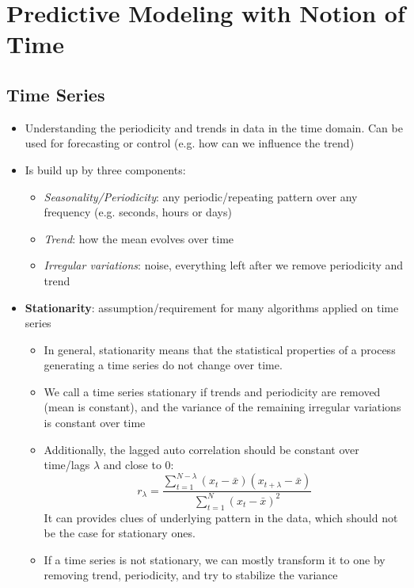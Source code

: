 \section{Predictive Modeling with Notion of Time}
\subsection{Time Series}
\begin{itemize}
	\item Understanding the periodicity and trends in data in the time domain. Can be used for forecasting or control (e.g. how can we influence the trend)
	\item Is build up by three components:
	\begin{itemize}
		\item \textit{Seasonality/Periodicity}: any periodic/repeating pattern over any frequency (e.g. seconds, hours or days)
		\item \textit{Trend}: how the mean evolves over time
		\item \textit{Irregular variations}: noise, everything left after we remove periodicity and trend
	\end{itemize}
	\item \textbf{Stationarity}: assumption/requirement for many algorithms applied on time series
	\begin{itemize}
		\item In general, stationarity means that the statistical properties of a process generating a time series do not change over time.
		\item We call a time series stationary if trends and periodicity are removed (mean is constant), and the variance of the remaining irregular variations is constant over time
		\item Additionally, the lagged auto correlation should be constant over time/lags $\lambda$ and close to $0$:
		$$r_{\lambda} = \frac{\sum\limits_{t=1}^{N-\lambda} (x_t - \bar{x}) (x_{t+\lambda} - \bar{x})}{\sum\limits_{t=1}^{N}(x_t - \bar{x})^2}$$
		It can provides clues of underlying pattern in the data, which should not be the case for stationary ones.
		\item If a time series is not stationary, we can mostly transform it to one by removing trend, periodicity, and try to stabilize the variance
	\end{itemize}
\end{itemize}
